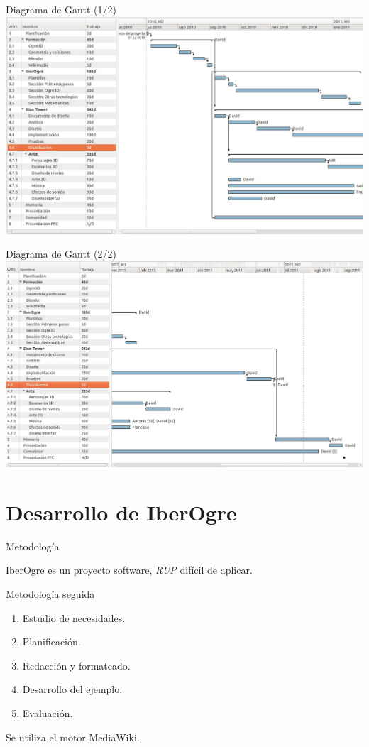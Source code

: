 \documentclass[green]{beamer}
\begin{document}
\begin{frame}{Diagrama de Gantt (1/2)}
\includegraphics[scale=0.24]{img/planificacion1.jpg}
\end{frame}

\begin{frame}{Diagrama de Gantt (2/2)}
\includegraphics[scale=0.24]{img/planificacion2.jpg}
\end{frame}

\section[IberOgre]{Desarrollo de IberOgre}

    
\begin{frame}{Metodología}
    
    IberOgre es un proyecto software, \textit{RUP} difícil de aplicar.
    
    \begin{block}{Metodología seguida}
	\begin{enumerate}
	    \item Estudio de necesidades.
	    \item Planificación.
	    \item Redacción y formateado.
	    \item Desarrollo del ejemplo.
	    \item Evaluación.
	\end{enumerate}
    \end{block}
    
    Se utiliza el motor MediaWiki.
    
\end{frame}
\end{document}
